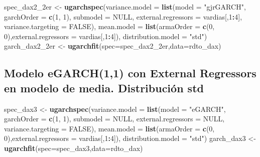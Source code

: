 \documentclass[
  11pt,
]{article}
\newenvironment{Shaded}{\begin{snugshade}}{\end{snugshade}}
\newcommand{\DataTypeTok}[1]{\textcolor[rgb]{0.13,0.29,0.53}{#1}}
\newcommand{\DecValTok}[1]{\textcolor[rgb]{0.00,0.00,0.81}{#1}}
\newcommand{\KeywordTok}[1]{\textcolor[rgb]{0.13,0.29,0.53}{\textbf{#1}}}
\newcommand{\NormalTok}[1]{#1}
\newcommand{\OperatorTok}[1]{\textcolor[rgb]{0.81,0.36,0.00}{\textbf{#1}}}
\newcommand{\OtherTok}[1]{\textcolor[rgb]{0.56,0.35,0.01}{#1}}
\newcommand{\StringTok}[1]{\textcolor[rgb]{0.31,0.60,0.02}{#1}}
\begin{document}
\begin{Shaded}
\begin{Highlighting}[]
\NormalTok{spec_dax2_2er <-}\StringTok{ }\KeywordTok{ugarchspec}\NormalTok{(}\DataTypeTok{variance.model =} \KeywordTok{list}\NormalTok{(}\DataTypeTok{model =} \StringTok{"gjrGARCH"}\NormalTok{, }\DataTypeTok{garchOrder =} \KeywordTok{c}\NormalTok{(}\DecValTok{1}\NormalTok{, }\DecValTok{1}\NormalTok{), }
                    \DataTypeTok{submodel =} \OtherTok{NULL}\NormalTok{, }\DataTypeTok{external.regressors  =}\NormalTok{ vardias[,}\DecValTok{1}\OperatorTok{:}\DecValTok{4}\NormalTok{], }\DataTypeTok{variance.targeting =} \OtherTok{FALSE}\NormalTok{), }
                    \DataTypeTok{mean.model =} \KeywordTok{list}\NormalTok{(}\DataTypeTok{armaOrder =} \KeywordTok{c}\NormalTok{(}\DecValTok{0}\NormalTok{, }\DecValTok{0}\NormalTok{),}\DataTypeTok{external.regressors =}\NormalTok{ vardias[,}\DecValTok{1}\OperatorTok{:}\DecValTok{4}\NormalTok{]),}
               \DataTypeTok{distribution.model =} \StringTok{"std"}\NormalTok{)}
\NormalTok{garch_dax2_2er <-}\StringTok{ }\KeywordTok{ugarchfit}\NormalTok{(}\DataTypeTok{spec=}\NormalTok{spec_dax2_2er,}\DataTypeTok{data=}\NormalTok{rdto_dax)}
\end{Highlighting}
\end{Shaded}

\hypertarget{modelo-egarch11-con-external-regressors-en-modelo-de-media.-distribuciuxf3n-std}{%
\subsection{Modelo eGARCH(1,1) con External Regressors en modelo de
media. Distribución
std}\label{modelo-egarch11-con-external-regressors-en-modelo-de-media.-distribuciuxf3n-std}}

\begin{Shaded}
\begin{Highlighting}[]
\NormalTok{spec_dax3 <-}\StringTok{ }\KeywordTok{ugarchspec}\NormalTok{(}\DataTypeTok{variance.model =} \KeywordTok{list}\NormalTok{(}\DataTypeTok{model =} \StringTok{"eGARCH"}\NormalTok{, }\DataTypeTok{garchOrder =} \KeywordTok{c}\NormalTok{(}\DecValTok{1}\NormalTok{, }\DecValTok{1}\NormalTok{), }
                    \DataTypeTok{submodel =} \OtherTok{NULL}\NormalTok{, }\DataTypeTok{external.regressors =} \OtherTok{NULL}\NormalTok{, }\DataTypeTok{variance.targeting =} \OtherTok{FALSE}\NormalTok{), }
                    \DataTypeTok{mean.model =} \KeywordTok{list}\NormalTok{(}\DataTypeTok{armaOrder =} \KeywordTok{c}\NormalTok{(}\DecValTok{0}\NormalTok{, }\DecValTok{0}\NormalTok{),}\DataTypeTok{external.regressors =}\NormalTok{ vardias[,}\DecValTok{1}\OperatorTok{:}\DecValTok{4}\NormalTok{]),}
               \DataTypeTok{distribution.model =} \StringTok{"std"}\NormalTok{)}
\NormalTok{garch_dax3 <-}\StringTok{ }\KeywordTok{ugarchfit}\NormalTok{(}\DataTypeTok{spec=}\NormalTok{spec_dax3,}\DataTypeTok{data=}\NormalTok{rdto_dax)}
\end{Highlighting}
\end{Shaded}
\end{document}
